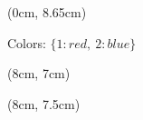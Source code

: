 \begin{textblock*}{8cm}(0cm, 8.65cm) %
  \begin{center}
    \small
    Colors: $\{1:red,\ 2:blue\}$
  \end{center}
\end{textblock*}

\begin{textblock*}{8cm}(8cm, 7cm) %
  \begin{center}

  \end{center}
\end{textblock*}

\begin{textblock*}{8cm}(8cm, 7.5cm) %

\end{textblock*}

